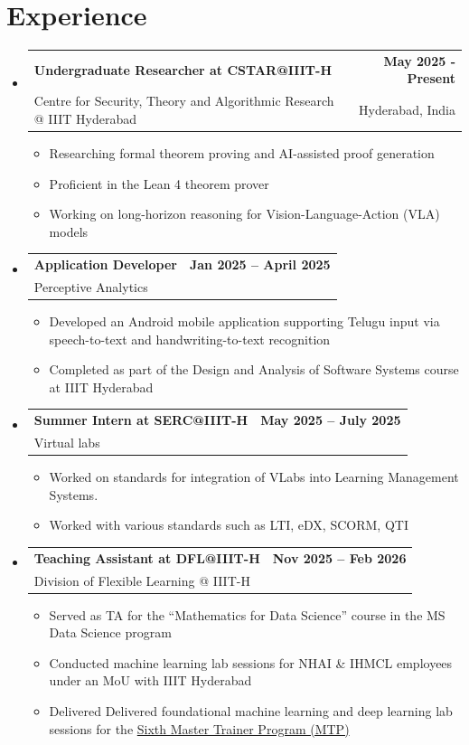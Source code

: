 \documentclass[a4paper,10pt]{article}
\makeatletter
\newcommand{\resumeItem}[1]{\item[\textcolor{bulletcolor}{\textbullet}] \small{#1}}
\newcommand{\resumeSubheading}[4]{
  \vspace{-2pt}\item
    \begin{tabular*}{0.97\textwidth}[t]{l@{\extracolsep{\fill}}r}
      \textbf{#1} & \textbf{\small #2} \\
      {\small #3} & {\small #4} \\
    \end{tabular*}\vspace{-7pt}
}
\makeatother
\begin{document}
\section{Experience}
\begin{itemize}[leftmargin=0.15in, label={}]
      \resumeSubheading{Undergraduate Researcher at CSTAR@IIIT-H}{May 2025 - Present}{Centre for Security, Theory and Algorithmic Research @ IIIT Hyderabad}{Hyderabad, India}
    \begin{itemize}[leftmargin=*, itemsep=0pt]
        
\resumeItem{Researching formal theorem proving and AI-assisted proof generation}
\resumeItem{Proficient in the Lean 4 theorem prover}
\resumeItem{Working on long-horizon reasoning for Vision-Language-Action (VLA) models}
       
    \end{itemize}
  
        
    \resumeSubheading
        {Application Developer}{Jan 2025 -- April 2025}
        {Perceptive Analytics}{}
        \begin{itemize}[leftmargin=0.15in]
            
\resumeItem{Developed an Android mobile application supporting Telugu input via speech-to-text and handwriting-to-text recognition}
\resumeItem{Completed as part of the Design and Analysis of Software Systems course at IIIT Hyderabad}
        \end{itemize}
    
    \resumeSubheading
        {Summer Intern at SERC@IIIT-H}{May 2025 -- July 2025}
        {Virtual labs}{}
        \begin{itemize}[leftmargin=0.15in]
            \resumeItem{Worked on standards for integration of VLabs into Learning Management Systems.}
            \resumeItem{Worked with various standards such as LTI, eDX, SCORM, QTI}
        \end{itemize}
    \resumeSubheading
        {Teaching Assistant at DFL@IIIT-H}{Nov 2025 -- Feb 2026}
        {Division of Flexible Learning @ IIIT-H}{}
        \begin{itemize}[leftmargin=0.15in]
            
\resumeItem{Served as TA for the ``Mathematics for Data Science'' course in the MS Data Science program}
\resumeItem{Conducted machine learning lab sessions for NHAI \& IHMCL employees under an MoU with IIIT Hyderabad}
\resumeItem{Delivered 
Delivered foundational machine learning and deep learning lab sessions for the 
\href{https://robotics.iiit.ac.in/Events/}{Sixth Master Trainer Program
 (MTP)}}

        \end{itemize}

\end{itemize}
\end{document}

